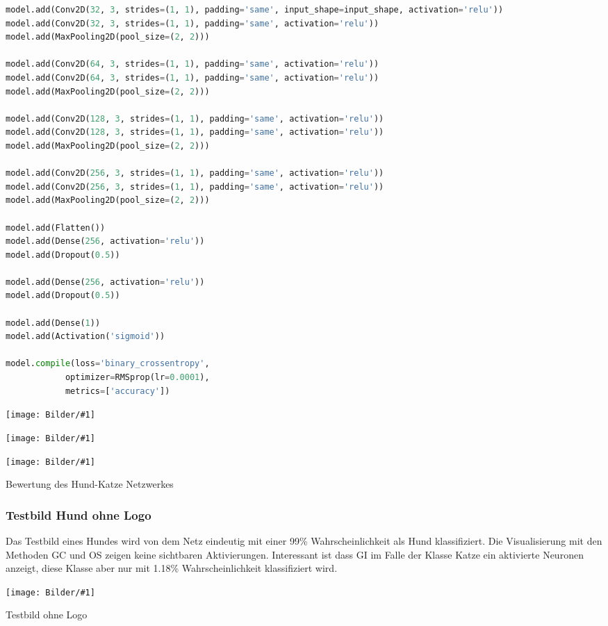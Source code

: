 \documentclass[
  12pt, %
  a4paper, %
  oneside, %
  openany, 
  numbers=noenddot, %
  BCOR=5mm, %
  parskip=half*, %
  thesis, %
]{bfhbook}
\newcommand{\imgText}[3]{
\begin{center}
    \begin{minipage}[t]{0.6\textwidth}
    		\vspace{0pt}
		\texttt{[image: Bilder/\#1]}
		\caption{#2}
	\end{minipage}\hfill
    \begin{minipage}[t]{0.4\textwidth}
    		\vspace{0pt}
  		#3
    \end{minipage}
\end{center}
}
\newcommand{\fullImg}[2]{
\begin{center}
\begin{minipage}[t]{\linewidth}
\texttt{[image: Bilder/\#1]}
\caption{#2}
\end{minipage}
\end{center}
}
\begin{document}
\begin{lstlisting}[language=Python]
model.add(Conv2D(32, 3, strides=(1, 1), padding='same', input_shape=input_shape, activation='relu'))
model.add(Conv2D(32, 3, strides=(1, 1), padding='same', activation='relu'))
model.add(MaxPooling2D(pool_size=(2, 2)))

model.add(Conv2D(64, 3, strides=(1, 1), padding='same', activation='relu'))
model.add(Conv2D(64, 3, strides=(1, 1), padding='same', activation='relu'))
model.add(MaxPooling2D(pool_size=(2, 2)))

model.add(Conv2D(128, 3, strides=(1, 1), padding='same', activation='relu'))
model.add(Conv2D(128, 3, strides=(1, 1), padding='same', activation='relu'))
model.add(MaxPooling2D(pool_size=(2, 2)))

model.add(Conv2D(256, 3, strides=(1, 1), padding='same', activation='relu'))
model.add(Conv2D(256, 3, strides=(1, 1), padding='same', activation='relu'))
model.add(MaxPooling2D(pool_size=(2, 2)))

model.add(Flatten())
model.add(Dense(256, activation='relu'))
model.add(Dropout(0.5))

model.add(Dense(256, activation='relu'))
model.add(Dropout(0.5))

model.add(Dense(1))
model.add(Activation('sigmoid'))
    
model.compile(loss='binary_crossentropy',
            optimizer=RMSprop(lr=0.0001),
            metrics=['accuracy'])
\end{lstlisting}

\imgText{Training-Manipulated-LogLoss.png}{}{}
\imgText{Training-Manipulated-Accuracy.png}{}{}

\imgText{Training-Manipulated-StatisticsTable.png}{Bewertung des Hund-Katze Netzwerkes}{

}

\subsubsection*{Testbild Hund ohne Logo}
Das Testbild eines Hundes wird von dem Netz eindeutig mit einer 99\% Wahrscheinlichkeit als Hund klassifiziert. Die Visualisierung mit den Methoden \acrshort{GC} und \Gls{OS} zeigen keine sichtbaren Aktivierungen. Interessant ist dass \Gls{GI} im Falle der Klasse Katze ein aktivierte Neuronen anzeigt, diese Klasse aber nur mit 1.18\% Wahrscheinlichkeit klassifiziert wird.
\fullImg{Manipulated_case_img7.png}{Testbild ohne Logo}
\end{document}
